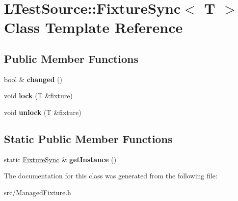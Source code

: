 \hypertarget{class_l_test_source_1_1_fixture_sync}{\section{L\-Test\-Source\-:\-:Fixture\-Sync$<$ T $>$ Class Template Reference}
\label{class_l_test_source_1_1_fixture_sync}
}
\subsection*{Public Member Functions}
\begin{DoxyCompactItemize}
\item 
\hypertarget{class_l_test_source_1_1_fixture_sync_ae078c5beb5aa53cf61814fa54bade8e7}{bool \& {\bfseries changed} ()}\label{class_l_test_source_1_1_fixture_sync_ae078c5beb5aa53cf61814fa54bade8e7}

\item 
\hypertarget{class_l_test_source_1_1_fixture_sync_a4fcde67fd21600766721f7515aaf7a0b}{void {\bfseries lock} (T \&fixture)}\label{class_l_test_source_1_1_fixture_sync_a4fcde67fd21600766721f7515aaf7a0b}

\item 
\hypertarget{class_l_test_source_1_1_fixture_sync_a2ec2a4e2fbb36a5feb243c117799509e}{void {\bfseries unlock} (T \&fixture)}\label{class_l_test_source_1_1_fixture_sync_a2ec2a4e2fbb36a5feb243c117799509e}

\end{DoxyCompactItemize}
\subsection*{Static Public Member Functions}
\begin{DoxyCompactItemize}
\item 
\hypertarget{class_l_test_source_1_1_fixture_sync_a3d61004fbc7b3d86b70e8540aba6e616}{static \hyperlink{class_l_test_source_1_1_fixture_sync}{Fixture\-Sync} \& {\bfseries get\-Instance} ()}\label{class_l_test_source_1_1_fixture_sync_a3d61004fbc7b3d86b70e8540aba6e616}

\end{DoxyCompactItemize}


The documentation for this class was generated from the following file\-:\begin{DoxyCompactItemize}
\item 
src/Managed\-Fixture.\-h\end{DoxyCompactItemize}
